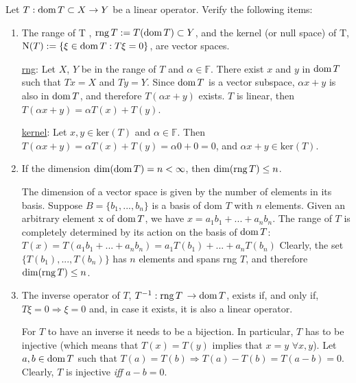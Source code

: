 \documentclass{article}
\theoremstyle{remark}
\newenvironment{exercise}[1]
  {\renewcommand\theinnerex{#1}\innerex}
  {\endinnerex}
\begin{document}
\begin{exercise}{1.1.5}
    Let $T : \operatorname{dom}{T} \subset X \rightarrow Y$ be a linear operator. Verify the following
    items:

    \begin{enumerate}
        \item The range of T , $\operatorname{rng} T := T (\operatorname{dom} T) \subset Y$, and the kernel (or null space) of T,
              $\operatorname{N}(T) := \{\xi \in \operatorname{dom} T : T \xi = 0\}$, are vector spaces.


              \underline{rng}: Let $X$, $Y$ be in the range of $T$ and $\alpha \in \mathbb{F}$. There
              exist $x$ and $y$ in $\operatorname{dom} T$ such that $Tx=X$ and $Ty = Y$. Since $\operatorname{dom} T$ is a vector
              subspace, $\alpha x + y$ is also in $\operatorname{dom} T$, and therefore $T(\alpha x + y)$ exists. $T$
              is linear, then $T(\alpha x + y) = \alpha T(x) + T(y)$.


              \underline{kernel}:
              Let $x, y \in \textrm{ker}(T)$ and $\alpha \in \mathbb{F}$. Then $T(\alpha x+y) = \alpha T(x) + T(y) = \alpha 0 + 0 = 0$,
              and $\alpha x + y \in \textrm{ker}(T)$.


        \item If the dimension $\dim(\operatorname{dom} T) = n < \infty$, then $\dim(\operatorname{rng} T ) \leq n$.


              The dimension of a vector space is given by the number of elements in its basis. Suppose $B = \{ b_1, ..., b_n\}$
              is a basis of dom $T$ with $n$ elements. Given an arbitrary element x of $\operatorname{dom} T$, we have $x = a_1 b_1 + ... + a_n b_n$.
              The range of $T$ is completely determined by its action on the basis of $\operatorname{dom} T$:
              \begin{math}
                  T(x) = T(a_1 b_1 + ... + a_n b_n) = a_1 T(b_1) + ... + a_n T(b_n)
              \end{math}
              Clearly, the set $\{T(b_1), ... , T(b_n)\}$ has $n$ elements and spans rng $T$, and therefore  $\dim(\operatorname{rng} T) \leq n$.


        \item The inverse operator of $T$, $T^{-1}: \operatorname{rng} T$ $\rightarrow \operatorname{dom} T$, exists if, and only if, $T\xi = 0 \Rightarrow \xi = 0$
              and, in case it exists, it is also a linear operator.


              For $T$ to have an inverse it needs to be a bijection. In particular, $T$ has to be injective (which means that $T(x) = T(y)$ implies that $x=y$ $\forall x, y$).
              Let $a,b \in \operatorname{dom} T$ such that $T(a) = T(b) \Rightarrow T(a) - T(b) = T(a-b) = 0$. Clearly, $T$
              is injective \textit{iff} $a-b = 0$.


\end{enumerate}
\end{exercise}
\end{document}
